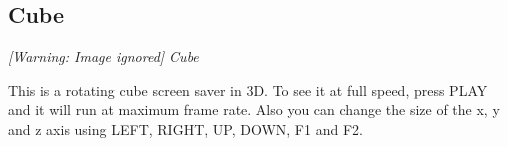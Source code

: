 \subsection{Cube}
{\centering\itshape
  [Warning: Image ignored] %
 \newline
Cube
\par}

This is a rotating cube screen saver in 3D.
To see it at full speed, press PLAY and it will run at maximum frame rate. Also you can change the size of the x, y and z axis using  LEFT, RIGHT, UP, DOWN, F1 and F2.


